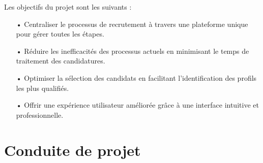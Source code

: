 
Les objectifs du projet sont les suivants :
\begin{itemize}
    \item[•] Centraliser le processus de recrutement à travers une plateforme unique pour gérer toutes les étapes.
    \item[•] Réduire les inefficacités des processus actuels en minimisant le temps de traitement des candidatures.
    \item[•] Optimiser la sélection des candidats en facilitant l'identification des profils les plus qualifiés.
    \item[•] Offrir une expérience utilisateur améliorée grâce à une interface intuitive et professionnelle.
\end{itemize}

\section{Conduite de projet}

